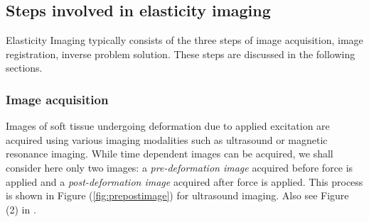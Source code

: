 \documentclass[12pt]{article}
\begin{document}
\subsection{Steps involved in elasticity imaging}
Elasticity Imaging typically consists of the three steps of image acquisition, image registration, inverse problem solution. These steps are discussed in the following sections.
\subsubsection{Image acquisition} Images of soft tissue undergoing deformation due to applied excitation are acquired using various imaging modalities such as ultrasound or magnetic resonance imaging. While time dependent images can be acquired, we shall consider here only two images: a \textit{pre-deformation image} acquired before force is applied and a \textit{post-deformation image} acquired after force is applied. This process is shown in Figure (\ref{fig:prepostimage}) for ultrasound imaging. Also see Figure (2) in \cite{paper:konofagou2004}.
\end{document}
